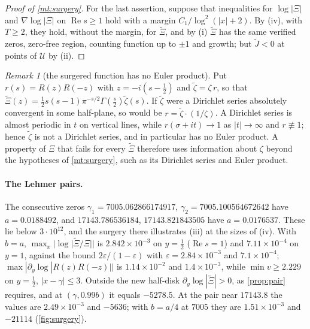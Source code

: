 \documentclass[11pt]{article}
\theoremstyle{definition}\newtheorem{definition}[theorem]{Definition}
\theoremstyle{remark}\newtheorem{remark}[theorem]{Remark}
\renewcommand{\Re}{\operatorname{Re}}\renewcommand{\Im}{\operatorname{Im}}
\begin{document}
\begin{proof}[Proof of \cref{mt:surgery}]
For the last assertion, suppose that inequalities for $\log|\Xi|$ and $\nabla\log|\Xi|$ on $\Re s\ge1$ hold with a margin $C_1/\log^2(|x|+2)$. By (iv), with $T\ge2$, they hold, without the margin, for $\widetilde\Xi$, and by (i) $\widetilde\Xi$ has the same verified zeros, zero-free region, counting function up to $\pm1$ and growth; but $\widetilde J<0$ at points of $\mathcal U$ by (ii).
\end{proof}

\begin{remark}[the surgered function has no Euler product]\label{rem:noeuler}
Put $r(s)=R(z)R(-z)$ with $z=-i(s-\frac12)$ and $\widetilde\zeta=\zeta\,r$, so that $\widetilde\Xi(z)=\frac12s(s-1)\pi^{-s/2}\Gamma(\frac s2)\widetilde\zeta(s)$. If $\widetilde\zeta$ were a Dirichlet series absolutely convergent in some half-plane, so would be $r=\widetilde\zeta\cdot(1/\zeta)$. A Dirichlet series is almost periodic in $t$ on vertical lines, while $r(\sigma+it)\to1$ as $|t|\to\infty$ and $r\not\equiv1$; hence $\widetilde\zeta$ is not a Dirichlet series, and in particular has no Euler product. A property of $\Xi$ that fails for every $\widetilde\Xi$ therefore uses information about $\zeta$ beyond the hypotheses of \cref{mt:surgery}, such as its Dirichlet series and Euler product.
\end{remark}

\paragraph{The Lehmer pairs.} The consecutive zeros $\gamma_1=7005.062866174917$, $\gamma_2=7005.100564672642$ have $a=0.0188492$, and $17143.786536184$, $17143.821843505$ have $a=0.0176537$. These lie below $3\cdot10^{12}$, and the surgery there illustrates (iii) at the sizes of (iv). With $b=a$, $\max_x|\log|\widetilde\Xi/\Xi||$ is $2.842\times10^{-3}$ on $y=\frac12$ ($\Re s=1$) and $7.11\times10^{-4}$ on $y=1$, against the bound $2\varepsilon/(1-\varepsilon)$ with $\varepsilon=2.84\times10^{-3}$ and $7.1\times10^{-4}$; $\max|\partial_y\log|R(z)R(-z)||$ is $1.14\times10^{-2}$ and $1.4\times10^{-3}$, while $\min v\ge2.229$ on $y=\frac12$, $|x-\gamma|\le3$. Outside the new half-disk $\partial_y\log|\widetilde\Xi|>0$, as \cref{prop:pair} requires, and at $(\gamma,0.99b)$ it equals $-5278.5$. At the pair near $17143.8$ the values are $2.49\times10^{-3}$ and $-5636$; with $b=a/4$ at $7005$ they are $1.51\times10^{-3}$ and $-21114$ (\cref{fig:surgery}).
\end{document}
